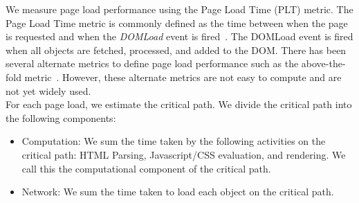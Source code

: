 {}

\noindent We measure page load  performance using the Page Load Time (PLT) metric. The Page Load Time metric is commonly defined as the time between when the page is requested and when the {\em DOMLoad} event is fired~\cite{wprof}. The DOMLoad event is fired when all  objects are
fetched, processed, and added to the DOM. There has been several alternate metrics to define page load performance such as the above-the-fold metric~\cite{aft}. However, these alternate metrics are not easy to compute and are not yet widely used. \\

\noindent For each page load, we  estimate the critical path. We divide the critical path into the following components:
\begin{itemize}
\item Computation: We sum the time taken by the following activities on the critical path: HTML Parsing, Javascript/CSS evaluation, and rendering. We call this the computational component of the critical path. 
\item Network: We sum the time taken to load each object on the critical path. 
\end{itemize}


